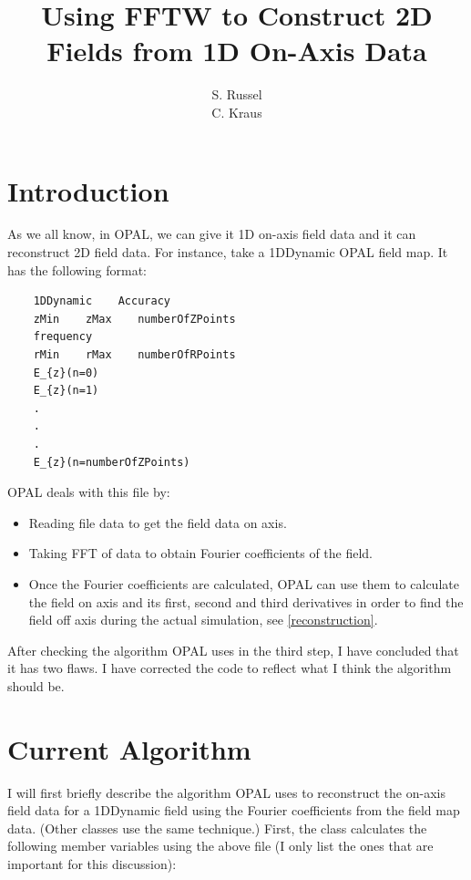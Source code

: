 \documentclass{report}
\newenvironment{fmpage}
   {\vspace{-0.4cm}\begin{lrbox}{\fmbox}\begin{minipage}[t]{\textwidth}\vspace{0.1cm}}
   {\vspace{-0.4cm}\end{minipage}\end{lrbox}\begin{center}\fcolorbox{black}{lightgray}{\usebox{\fmbox}}\end{center}}
\begin{document}
\title{Using FFTW to Construct 2D Fields from 1D On-Axis Data}
\author{S. Russel\\ C. Kraus}
\maketitle

\section{Introduction}
As we all know, in OPAL, we can give it 1D on-axis field data and it can reconstruct 2D field data. For instance,
take a 1DDynamic OPAL field map. It has the following format:

\begin{fmpage}
\begin{verbatim}
    1DDynamic    Accuracy
    zMin    zMax    numberOfZPoints
    frequency
    rMin    rMax    numberOfRPoints
    E_{z}(n=0)
    E_{z}(n=1)
    .
    .
    .
    E_{z}(n=numberOfZPoints)
\end{verbatim}
\end{fmpage}
OPAL deals with this file by:
\begin{itemize}
\item Reading file data to get the field data on axis.
\item Taking FFT of data to obtain Fourier coefficients of the field.
\item Once the Fourier coefficients are calculated, OPAL can use them to calculate the field on axis and its first,
  second and third derivatives in order to find the field off axis during the actual simulation, see \ref{reconstruction}.
\end{itemize}
After checking the algorithm OPAL uses in the third step, I have concluded that it has two flaws. I have corrected the
code to reflect what I think the algorithm should be.

\section{Current Algorithm}
I will first briefly describe the algorithm OPAL uses to reconstruct the on-axis field data for a 1DDynamic field using the Fourier
coefficients from the field map data. (Other classes use the same technique.) First, the class calculates the following member
variables using the above file (I only list the ones that are important for this discussion):
\end{document}
